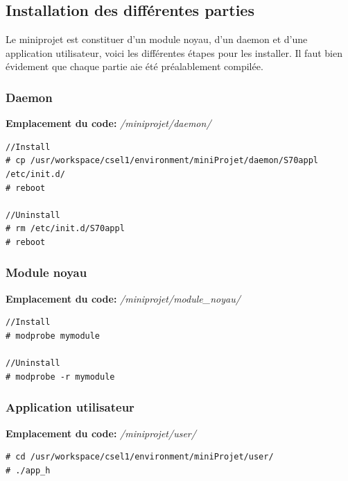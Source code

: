 \subsection{Installation des différentes parties}
Le miniprojet est constituer d'un module noyau, d'un daemon et d'une application utilisateur, voici les différentes étapes pour les installer. Il faut bien évidement que chaque partie aie été préalablement compilée.
\subsubsection{Daemon}
\textbf{Emplacement du code: }\textit{/miniprojet/daemon/}\\
\begin{lstlisting}
//Install
# cp /usr/workspace/csel1/environment/miniProjet/daemon/S70appl /etc/init.d/
# reboot

//Uninstall
# rm /etc/init.d/S70appl
# reboot
\end{lstlisting}
\subsubsection{Module noyau}
\textbf{Emplacement du code: }\textit{/miniprojet/module\_noyau/}\\
\begin{lstlisting}
//Install
# modprobe mymodule

//Uninstall
# modprobe -r mymodule
\end{lstlisting}
\subsubsection{Application utilisateur}
\textbf{Emplacement du code: }\textit{/miniprojet/user/}\\
\begin{lstlisting}
# cd /usr/workspace/csel1/environment/miniProjet/user/
# ./app_h 
\end{lstlisting}
